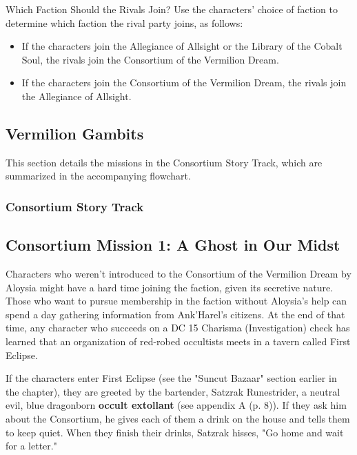 \documentclass[letterpaper, 11pt, bg=full, twocolumn]{dndbook}
\begin{document}
\begin{DndSidebar}{Which Faction Should the Rivals Join?}
Use the characters' choice of faction to determine which faction the rival party joins, as follows:
\begin{itemize}
\item If the characters join the Allegiance of Allsight or the Library of the Cobalt Soul, the rivals join the Consortium of the Vermilion Dream.
\item If the characters join the Consortium of the Vermilion Dream, the rivals join the Allegiance of Allsight.
\end{itemize}
\end{DndSidebar}

\subsection{Vermilion Gambits}

This section details the missions in the Consortium Story Track, which are summarized in the accompanying flowchart.

\subsubsection{Consortium Story Track}



\subsection{Consortium Mission 1: A Ghost in Our Midst}

Characters who weren't introduced to the Consortium of the Vermilion Dream by Aloysia might have a hard time joining the faction, given its secretive nature. Those who want to pursue membership in the faction without Aloysia's help can spend a day gathering information from Ank'Harel's citizens. At the end of that time, any character who succeeds on a DC 15 Charisma (Investigation) check has learned that an organization of red-robed occultists meets in a tavern called First Eclipse.

If the characters enter First Eclipse (see the "Suncut Bazaar" section earlier in the chapter), they are greeted by the bartender, Satzrak Runestrider, a neutral evil, blue dragonborn \textbf{occult extollant} (see appendix A (p. 8)). If they ask him about the Consortium, he gives each of them a drink on the house and tells them to keep quiet. When they finish their drinks, Satzrak hisses, "Go home and wait for a letter."
\end{document}
